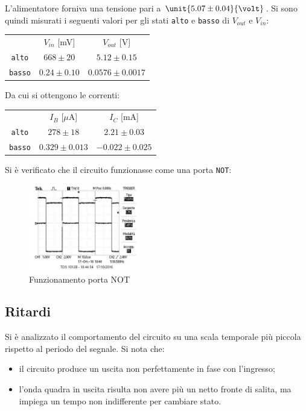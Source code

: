 \documentclass[10pt,a4paper]{article}
\def\code#1{\texttt{#1}}
\begin{document}
L'alimentatore forniva una tensione pari a $\unit{5.07 \pm 0.04}{\volt}$.
Si sono quindi misurati i seguenti valori per gli stati \code{alto} e \code{basso} di $V_{out}$ e $V_{in}$:

\begin{table}[h!]
\centering
\begin{tabular}{c|c|c}
 & $V_{in}$ [mV]& $V_{out}$ [V]\\
\code{alto} & $668 \pm 20$ & $5.12 \pm 0.15$\\
\code{basso} & $0.24 \pm 0.10$ & $0.0576 \pm 0.0017$
\end{tabular}
\end{table}

Da cui si ottengono le correnti:
\begin{table}[h!]
\centering
\begin{tabular}{c|c|c}
 & $I_B$ [$\mu$A]& $I_C$ [mA]\\
\code{alto} & $278 \pm 18$ & $2.21 \pm 0.03$\\
\code{basso} & $0.329 \pm  0.013$ & $-0.022 \pm 0.025$
\end{tabular}
\end{table}

Si è verificato che il circuito funzionasse come una porta \code{NOT}:

\begin{figure}[h!]
	\centering
	\includegraphics[width=0.45\textwidth]{../oscilloscopio/not_tarocco.jpg}
	\caption{Funzionamento porta NOT}
\end{figure}
\subsection{Ritardi}
Si è analizzato il comportamento del circuito su una scala temporale più piccola rispetto al periodo del segnale. Si nota che:
\begin{itemize}
\item il circuito produce un uscita non perfettamente in fase con l'ingresso;
\item l'onda quadra in uscita risulta non avere più un netto fronte di salita, ma impiega un tempo non indifferente per cambiare stato.
\end{itemize}
\end{document}
